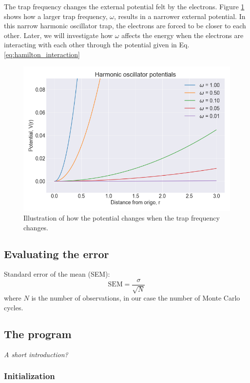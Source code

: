 The trap frequency changes the external potential felt by the electrons. Figure \ref{fig:harmonic_oscillator_potential} shows how a larger trap frequency, $\omega$, results in a narrower external potential. In this narrow harmonic oscillator trap, the electrons are forced to be closer to each other. Later, we will investigate how $\omega$ affects the energy when the electrons are interacting with each other through the potential given in Eq. \ref{eq:hamilton_interaction}

\begin{figure}[H]
\center
\includegraphics[width=0.7\linewidth]{../Results/harmonic_oscialltor_potentials}\caption{Illustration of how the potential changes when the trap frequency changes. }\label{fig:harmonic_oscillator_potential}
\end{figure}

\subsection{Evaluating the error}

Standard error of the mean (SEM):
\begin{equation}
\text{SEM} = \frac{\sigma}{\sqrt{N}}
\end{equation}
where $N$ is the number of observations, in our case the number of Monte Carlo cycles.

\subsection{The program}

\textit{A short introduction?}

\subsubsection{Initialization}

